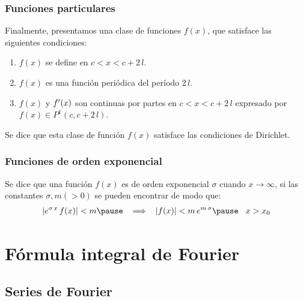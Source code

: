 \documentclass[12pt]{beamer}
\begin{document}
\begin{frame}
\frametitle{Funciones particulares}
Finalmente, presentamos una clase de funciones $f (x)$, que satisface las siguientes condiciones:
\pause
{}
\begin{enumerate}[<+->]
\item $f (x)$ se define en $c < x < c + 2 \, l$.
\item $f (x)$ es una función periódica del período $2 \, l$.
\item $f (x)$ y ${f}^{\prime} (x)$ son continuas por partes en $c  < x <c + 2 \, l$ expresado por $f (x) \in P^{1} (c, c + 2 \, l)$.
\end{enumerate}
\pause
Se dice que esta clase de función $f (x)$ satisface las condiciones de Dirichlet. 
\end{frame}
\begin{frame}
\frametitle{Funciones de orden exponencial}
Se dice que una función $f (x)$ es de orden exponencial $\sigma$ cuando $x \to \infty$, si las constantes $\sigma, m (> 0)$ se pueden encontrar de modo que:
\pause
\begin{eqnarray*}
\begin{aligned}
\abs{ e^{\sigma \, x} \, f (x)} < m \pause \hspace{0.3cm} \Longrightarrow \hspace{0.3cm} \abs{f (x)} < m \, e^{m \, \sigma} \pause \hspace{0.3cm} x > x_{0}
\end{aligned}
\end{eqnarray*}
\end{frame}



\section{Fórmula integral de Fourier}
\subsection{Series de Fourier}
\end{document}
